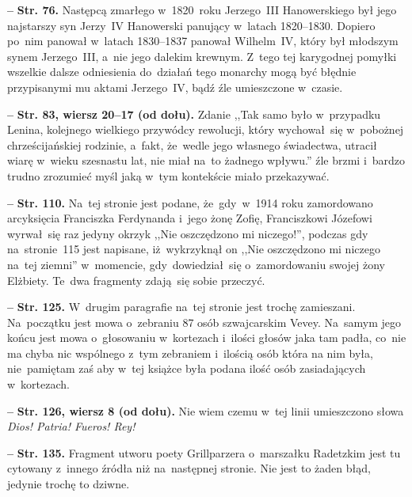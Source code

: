 \documentclass[a4paper,11pt]{article}  %
\newcommand{\spaceFour}{0.5em}
\newcommand{\tb}{\textbf}
\newcommand{\noi}{\noindent}
\newcommand{\start}{\noi \tb{--} {}}
\newcommand{\Str}[1]{\tb{Str. #1.}}
\newcommand{\StrWd}[2]{\tb{Str. #1, wiersz #2 (od dołu).}}
\begin{document}
\start \Str{76} Następcą zmarłego w~1820~roku Jerzego~III
Hanowerskiego był jego najstarszy syn Jerzy~IV Hanowerski panujący
w~latach 1820--1830. Dopiero po~nim panował w~latach 1830--1837
panował Wilhelm~IV, który był młodszym synem Jerzego~III, a~nie jego
dalekim krewnym. Z~tego tej karygodnej pomyłki wszelkie dalsze
odniesienia do~działań tego monarchy mogą być błędnie przypisanymi mu
aktami Jerzego~IV, bądź źle umieszczone w~czasie.

\vspace{\spaceFour}


\start \StrWd{83}{20--17} Zdanie ,,Tak samo było w~przypadku Lenina,
kolejnego wielkiego przywódcy rewolucji, który wychował~się w~pobożnej
chrześcijańskiej rodzinie, a~fakt, że~wedle jego własnego świadectwa,
utracił wiarę w~wieku szesnastu lat, nie miał na~to żadnego wpływu.''
źle brzmi i~bardzo trudno zrozumieć myśl jaką w~tym kontekście miało
przekazywać.

\vspace{\spaceFour}


\start \Str{110} Na~tej stronie jest podane, że~gdy~w~1914 roku
zamordowano arcyksięcia Franciszka Ferdynanda i~jego żonę Zofię,
Franciszkowi Józefowi wyrwał~się raz jedyny okrzyk ,,Nie oszczędzono
mi niczego!'', podczas gdy na~stronie~115 jest napisane, iż~wykrzyknął
on ,,Nie oszczędzono mi niczego na~tej ziemni'' w~momencie,
gdy~dowiedział~się o~zamordowaniu swojej żony Elżbiety. Te~dwa
fragmenty zdają~się sobie przeczyć.

\vspace{\spaceFour}

\start \Str{125} W~drugim paragrafie na~tej stronie jest trochę
zamieszani. Na~początku jest mowa o~zebraniu 87 osób szwajcarskim
Vevey. Na~samym jego końcu jest mowa o~głosowaniu w~kortezach i~ilości
głosów jaka tam padła, co~nie ma chyba nic wspólnego z~tym zebraniem
i~ilością osób która na nim była, nie~pamiętam zaś aby w~tej książce
była podana ilość osób zasiadających w~kortezach.

\vspace{\spaceFour}


\start \StrWd{126}{8} Nie wiem czemu w~tej linii umieszczono słowa
\emph{Dios! Patria! Fueros! Rey!}

\vspace{\spaceFour}


\start \Str{135} Fragment utworu poety Grillparzera o~marszałku
Radetzkim jest tu cytowany z~innego źródła niż na~następnej stronie.
Nie jest to żaden błąd, jedynie trochę to dziwne.
\end{document}
